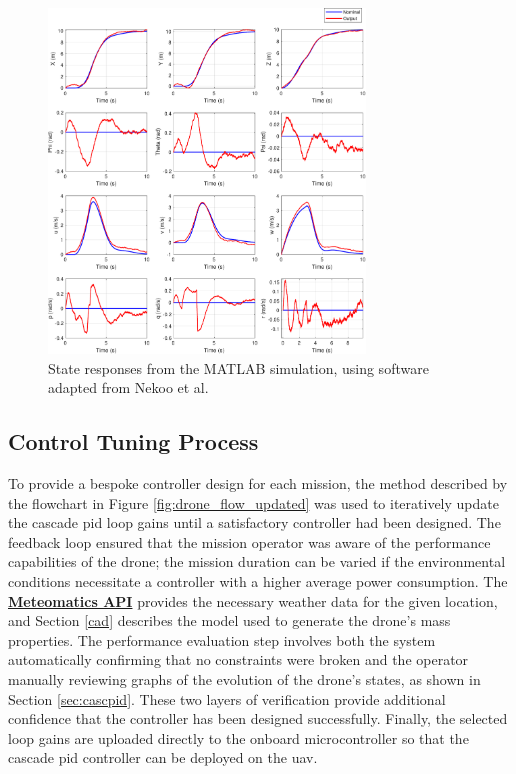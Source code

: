 \begin{figure}[H]
\centering
\includegraphics[width=0.75\textwidth]{figs/Samuel/Figures/twelveplotsvectorgraphic.pdf}
\caption[State Responses from the MATLAB Simulation]{State responses from the MATLAB simulation, using software adapted from Nekoo et al. \cite{nekoo}}
\label{fig:12sims}
\end{figure}










\subsection{Control Tuning Process}

To provide a bespoke controller design for each mission, the method described by the flowchart in Figure \ref{fig:drone_flow_updated} was used to iteratively update the cascade \gls{pid} loop gains until a satisfactory controller had been designed. The feedback loop ensured that the mission operator was aware of the performance capabilities of the drone; the mission duration can be varied if the environmental conditions necessitate a controller with a higher average power consumption. The \href{https://www.meteomatics.com/}{\textbf{Meteomatics API}} provides the necessary weather data for the given location, and Section \ref{cad} describes the model used to generate the drone's mass properties. The performance evaluation step involves both the system automatically confirming that no constraints were broken and the operator manually reviewing graphs of the evolution of the drone's states, as shown in Section \ref{sec:cascpid}. These two layers of verification provide additional confidence that the controller has been designed successfully. Finally, the selected loop gains are uploaded directly to the onboard microcontroller so that the cascade \gls{pid} controller can be deployed on the \gls{uav}. 

